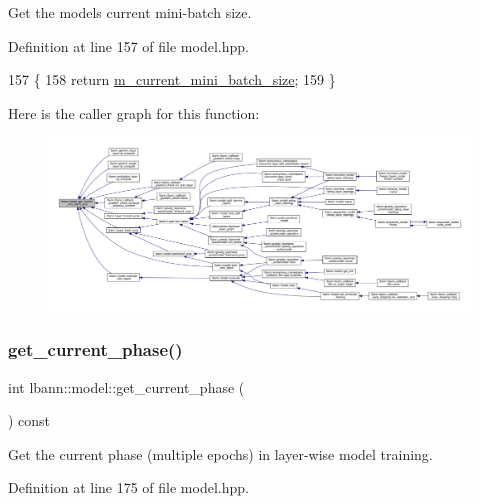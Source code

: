 Get the model\textquotesingle{}s current mini-\/batch size. 

Definition at line 157 of file model.\+hpp.


\begin{DoxyCode}
157                                                  \{
158     \textcolor{keywordflow}{return} \hyperlink{classlbann_1_1model_a982cea92d230bab5a47df504f02daf98}{m\_current\_mini\_batch\_size};
159   \}
\end{DoxyCode}
Here is the caller graph for this function\+:\nopagebreak
\begin{figure}[H]
\begin{center}
\leavevmode
\includegraphics[width=350pt]{classlbann_1_1model_a3eaad8fd538b99ecab9afca6dc3327fd_icgraph}
\end{center}
\end{figure}
\mbox{\label{classlbann_1_1model_afd569027be9b7a6adb08f486331384ac}} 
\subsubsection{\texorpdfstring{get\+\_\+current\+\_\+phase()}{get\_current\_phase()}}
{\footnotesize\ttfamily int lbann\+::model\+::get\+\_\+current\+\_\+phase (\begin{DoxyParamCaption}{ }\end{DoxyParamCaption}) const\hspace{0.3cm}{\ttfamily [inline]}}

Get the current phase (multiple epochs) in layer-\/wise model training. 

Definition at line 175 of file model.\+hpp.


